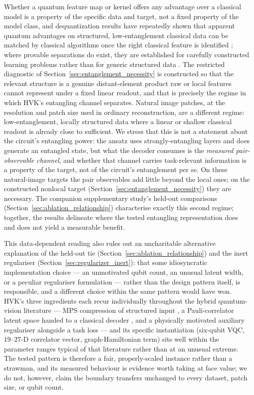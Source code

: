 \documentclass[pdflatex,sn-basic]{sn-jnl}
\begin{document}
Whether a quantum feature map or kernel offers any advantage over a classical
model is a property of the specific data and target, not a fixed property of the
model class, and dequantization results have repeatedly shown that apparent
quantum advantages on structured, low-entanglement classical data can be matched
by classical algorithms once the right classical feature is identified
\citep{Huang2021PowerData, Tang2019}; where provable separations do exist, they
are established for carefully constructed learning problems rather than for
generic structured data \citep{Gyurik2023}. The restricted diagnostic of
Section~\ref{sec:entanglement_necessity} is constructed so that the relevant
structure is a genuine distant-element product raw or local features cannot
represent under a fixed linear readout, and that is precisely the regime in which
HVK's entangling channel separates. Natural image patches, at the resolution and
patch size used in ordinary reconstruction, are a different regime:
low-entanglement, locally structured data where a linear or shallow classical
readout is already close to sufficient. We stress that this is not a statement
about the circuit's entangling power: the ansatz uses strongly-entangling layers
and does generate an entangled state, but what the decoder consumes is the
\emph{measured pair-observable channel}, and whether that channel carries
task-relevant information is a property of the target, not of the circuit's
entanglement per se. On these natural-image targets the pair observables add
little beyond the local ones; on the constructed nonlocal target
(Section~\ref{sec:entanglement_necessity}) they are necessary. The companion supplementary study's
held-out comparisons (Section~\ref{sec:ablation_relationship}) characterise
exactly this second regime; together, the results delineate where the tested
entangling representation does and does not yield a measurable benefit.

This data-dependent reading also rules out an uncharitable alternative
explanation of the held-out tie (Section~\ref{sec:ablation_relationship}) and the
inert regulariser (Section~\ref{sec:regularizer_inert}): that some idiosyncratic
implementation choice --- an unmotivated qubit count, an unusual latent width, or
a peculiar regulariser formulation --- rather than the design pattern itself, is
responsible, and a different choice within the same pattern would have won. HVK's
three ingredients each recur individually throughout the hybrid quantum-vision
literature --- MPS compression of structured input
\citep{Stoudenmire2016, Han2018, Cirac2021, Guala2023}, a Pauli-correlator latent
space handed to a classical decoder \citep{Havlicek2019}, and a physically
motivated auxiliary regulariser alongside a task loss \citep{Shi2022} --- and its
specific instantiation (six-qubit VQC, $19$--$27$-D correlator vector,
graph-Hamiltonian term) sits well within the parameter ranges typical of that
literature rather than at an unusual extreme. The tested pattern is therefore a
fair, properly-scaled instance rather than a strawman, and its measured behaviour
is evidence worth taking at face value; we do not, however, claim the boundary
transfers unchanged to every dataset, patch size, or qubit count.
\end{document}
